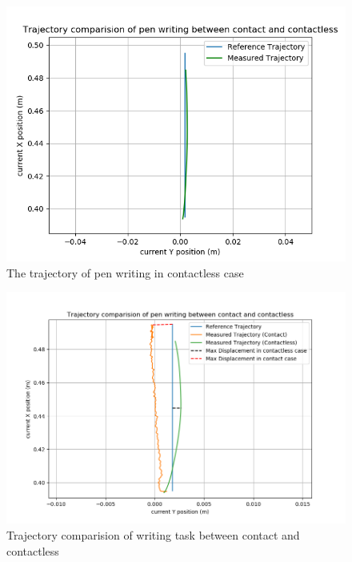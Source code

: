 \documentclass[report.tex]{subfiles}
\begin{document}
    \begin{figure}[H]
        \captionsetup[figure]{justification=centering}
                \centering
                \includegraphics[width=0.8\linewidth]{images/us2_contactless_traj.png}
                \caption{The trajectory of pen writing in contactless case}
                \label{fig:us2_nocon_plot}
    \end{figure}
    \begin{figure}[H]
        \centering
        \includegraphics[width=\linewidth]{images/us2_contactless_traj2.png}
        \caption{Trajectory comparision of writing task between contact and contactless}
        \label{fig:us2_traj_com_plot}
\end{figure}
\end{document}
